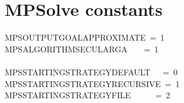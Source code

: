 \documentclass{article}\usepackage[]{graphicx}\usepackage[dvipsnames,table]{xcolor}
\makeatletter
\newcommand{\hlnum}[1]{\textcolor[rgb]{0.686,0.059,0.569}{#1}}%
\newcommand{\hlopt}[1]{\textcolor[rgb]{0,0,0}{#1}}%
\newcommand{\hldef}[1]{\textcolor[rgb]{0.345,0.345,0.345}{#1}}%
\newenvironment{kframe}{%
 \def\at@end@of@kframe{}%
 \ifinner\ifhmode%
  \def\at@end@of@kframe{\end{minipage}}%
  \begin{minipage}{\columnwidth}%
 \fi\fi%
 \def\FrameCommand##1{\hskip\@totalleftmargin \hskip-\fboxsep
 \colorbox{shadecolor}{##1}\hskip-\fboxsep
     \hskip-\linewidth \hskip-\@totalleftmargin \hskip\columnwidth}%
 \MakeFramed {\advance\hsize-\width
   \@totalleftmargin\z@ \linewidth\hsize
   \@setminipage}}%
 {\par\unskip\endMakeFramed%
 \at@end@of@kframe}
\newenvironment{knitrout}{}{} %
\makeatother
\begin{document}
\newpage
\section{MPSolve constants}
\begin{center}
\begin{minipage}[m]{15cm}
\begin{knitrout}\small
{}\color{fgcolor}\begin{kframe}
\noindent
\ttfamily
\hldef{MPS\textunderscore OUTPUT\textunderscore GOAL\textunderscore APPROXIMATE\ }\hlopt{=\ }\hldef{}\hlnum{1}\hspace*{\fill}\\
\hldef{MPS\textunderscore ALGORITHM\textunderscore SECULAR\textunderscore GA}\hldef{\ \ \ \ }\hldef{}\hlopt{=\ }\hldef{}\hlnum{1}\hspace*{\fill}\\
\hldef{}\hspace*{\fill}\\
\hldef{MPS\textunderscore STARTING\textunderscore STRATEGY\textunderscore DEFAULT}\hldef{\ \ \ }\hldef{}\hlopt{=\ }\hldef{}\hlnum{0}\hspace*{\fill}\\
\hldef{MPS\textunderscore STARTING\textunderscore STRATEGY\textunderscore RECURSIVE\ }\hlopt{=\ }\hldef{}\hlnum{1}\hspace*{\fill}\\
\hldef{MPS\textunderscore STARTING\textunderscore STRATEGY\textunderscore FILE}\hldef{\ \ \ \ \ \ }\hldef{}\hlopt{=\ }\hldef{}\hlnum{2}\hldef{\ \ }\hlnum{}\hldef{}\hldef{}\hspace*{\fill}
\mbox{}
\normalfont
\end{kframe}
\end{knitrout}
\end{minipage}
\end{center}

\newpage
\end{document}
